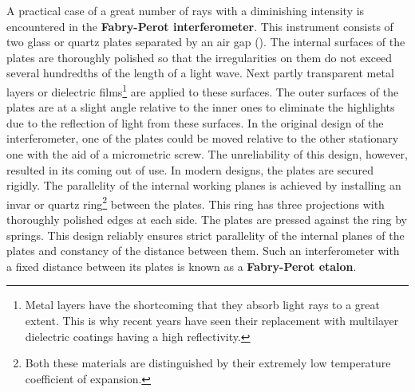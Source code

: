 A practical case of a great number of rays with a diminishing intensity is encountered in the \textbf{Fabry-Perot interferometer}.
This instrument consists of two glass or quartz plates separated by an air gap ().
The internal surfaces of the plates are thoroughly polished so that the irregularities on them do not exceed several hundredths of the length of a light wave.
Next partly transparent metal layers or dielectric films\footnote{Metal layers have the shortcoming that they absorb light rays to a great extent. This is why recent years have seen their replacement with multilayer dielectric coatings having a high reflectivity.} are applied to these surfaces.
The outer surfaces of the plates are at a slight angle relative to the inner ones to eliminate the highlights due to the reflection of light from these surfaces.
In the original design of the interferometer, one of the plates could be moved relative to the other stationary one with the aid of a micrometric screw.
The unreliability of this design, however, resulted in its coming out of use.
In modern designs, the plates are secured rigidly.
The parallelity of the internal working planes is achieved by installing an invar or quartz ring\footnote{Both these materials are distinguished by their extremely low temperature
coefficient of expansion.} between the plates.
This ring has three projections with thoroughly polished edges at each side.
The plates are pressed against the ring by springs.
This design reliably ensures strict parallelity of the internal planes of the plates and constancy of the distance between them.
Such an interferometer with a fixed distance between its plates is known as a \textbf{Fabry-Perot etalon}.


